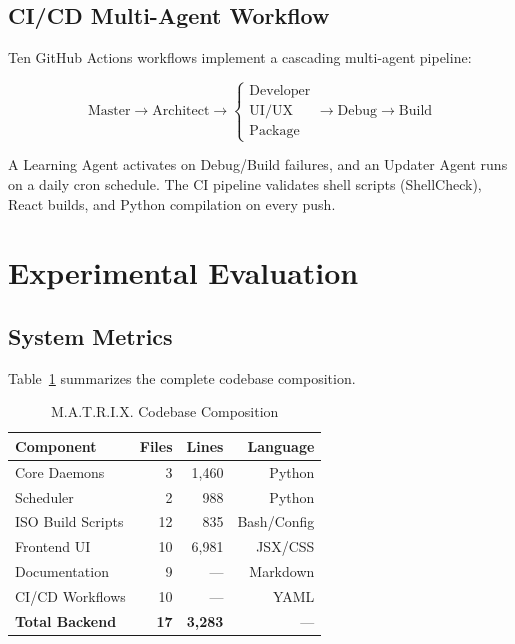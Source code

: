 \documentclass[conference]{IEEEtran}
\begin{document}
\subsection{CI/CD Multi-Agent Workflow}

Ten GitHub Actions workflows implement a cascading multi-agent pipeline:

\begin{equation*}
\text{Master} \rightarrow \text{Architect} \rightarrow \begin{cases} \text{Developer} \\ \text{UI/UX} \\ \text{Package} \end{cases} \rightarrow \text{Debug} \rightarrow \text{Build}
\end{equation*}

A Learning Agent activates on Debug/Build failures, and an Updater Agent runs on a daily cron schedule. The CI pipeline validates shell scripts (ShellCheck), React builds, and Python compilation on every push.


\section{Experimental Evaluation}
\label{sec:results}

\subsection{System Metrics}

Table~\ref{tab:codebase} summarizes the complete codebase composition.

\begin{table}[htbp]
\caption{M.A.T.R.I.X. Codebase Composition}
\label{tab:codebase}
\centering
\renewcommand{\arraystretch}{1.15}
\begin{tabular}{@{}lrrr@{}}
\toprule
\textbf{Component} & \textbf{Files} & \textbf{Lines} & \textbf{Language} \\
\midrule
Core Daemons & 3 & 1,460 & Python \\
Scheduler & 2 & 988 & Python \\
ISO Build Scripts & 12 & 835 & Bash/Config \\
Frontend UI & 10 & 6,981 & JSX/CSS \\
Documentation & 9 & --- & Markdown \\
CI/CD Workflows & 10 & --- & YAML \\
\midrule
\textbf{Total Backend} & \textbf{17} & \textbf{3,283} & --- \\
\bottomrule
\end{tabular}
\end{table}
\end{document}
